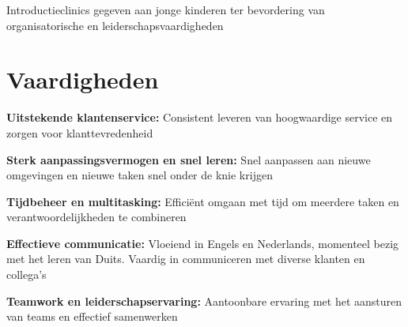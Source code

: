 	\vspace{0.10 cm}
	\begin{onecolentry}
		\begin{highlights}
			\item Introductieclinics gegeven aan jonge kinderen ter bevordering van organisatorische en leiderschapsvaardigheden
		\end{highlights}
	\end{onecolentry}
	
	\section{Vaardigheden}
	
	\begin{onecolentry}
		\textbf{Uitstekende klantenservice:} Consistent leveren van hoogwaardige service en zorgen voor klanttevredenheid
	\end{onecolentry}
	
	\vspace{0.2 cm}
	
	\begin{onecolentry}
		\textbf{Sterk aanpassingsvermogen en snel leren:} Snel aanpassen aan nieuwe omgevingen en nieuwe taken snel onder de knie krijgen
	\end{onecolentry}
	
	\vspace{0.2 cm}
	
	\begin{onecolentry}
		\textbf{Tijdbeheer en multitasking:} Efficiënt omgaan met tijd om meerdere taken en verantwoordelijkheden te combineren
	\end{onecolentry}
	
	\vspace{0.2 cm}
	
	\begin{onecolentry}
		\textbf{Effectieve communicatie:} Vloeiend in Engels en Nederlands, momenteel bezig met het leren van Duits. Vaardig in communiceren met diverse klanten en collega’s
	\end{onecolentry}
	
	\vspace{0.2 cm}
	
	\begin{onecolentry}
		\textbf{Teamwork en leiderschapservaring:} Aantoonbare ervaring met het aansturen van teams en effectief samenwerken
	\end{onecolentry}
	
	\vspace{0.2 cm}
	
